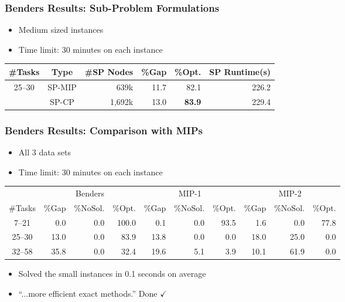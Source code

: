 \documentclass{beamer}
\begin{document}
\begin{frame}
\frametitle{Benders Results: Sub-Problem Formulations}
\begin{itemize}
	\item Medium sized instances\vspace{1mm}
	\item Time limit: 30 minutes on each instance
\end{itemize}
\begin{table}
	\centering
	\begin{tabular}{ccrrrr}
		\toprule
		\#Tasks & Type & \#SP Nodes & \%Gap & \%Opt. & SP Runtime(s) \\\midrule\midrule
		25--30 & SP-MIP{} & 639k & 11.7 & 82.1 & 226.2 \\
		 & SP-CP{} & 1,692k & 13.0 & {\bf 83.9} & 229.4 \\
		\bottomrule
	\end{tabular}
\end{table}
\end{frame}

\begin{frame}
\frametitle{Benders Results: Comparison with MIPs}
\begin{itemize}
	\item All 3 data sets\vspace{1mm}
	\item Time limit: 30 minutes on each instance
\end{itemize}
\begin{table}
	\setlength{\tabcolsep}{0.2em}
	\centering
	\small
	\begin{tabular}{crrrrrrrrr}
		\toprule
		& \multicolumn{3}{c}{Benders} & \multicolumn{3}{c}{MIP-1} & \multicolumn{3}{c}{MIP-2}  \\
		 \cmidrule(lr){2-4} \cmidrule(lr){5-7} \cmidrule(lr){8-10}
		\#Tasks & \%Gap &\%NoSol. &  \%Opt. & \%Gap & \%NoSol. & \%Opt. & \%Gap & \%NoSol. & \%Opt. \\\midrule\midrule
		7--21 & 0.0 & 0.0 & {\color{red} 100.0} & 0.1 & 0.0 & {\color{red} 93.5} & 1.6 & 0.0 & {\color{red} 77.8} \\
		25--30 & 13.0 & 0.0 & {\color{red} 83.9} & 13.8 & 0.0 & {\color{red} 0.0} & 18.0 & 25.0 & {\color{red} 0.0} \\
		32--58 & 35.8 & 0.0 & {\color{red} 32.4} & 19.6 & 5.1 & {\color{red} 3.9} & 10.1 & 61.9 & {\color{red} 0.0} \\
		\bottomrule
	\end{tabular}
\end{table}\pause
\begin{itemize}
	\item Solved the small instances in 0.1 seconds on average
	\item ``...more efficient exact methods.'' \pause Done $\checkmark$
\end{itemize}
\end{frame}
\end{document}
